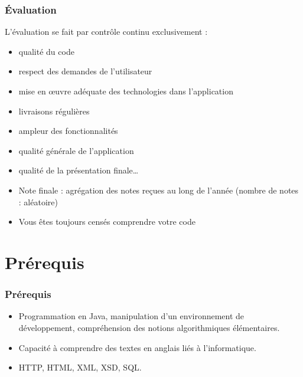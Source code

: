 \documentclass[english, french]{beamer}
\begin{document}
\begin{frame}
	\frametitle{Évaluation}
	L’évaluation se fait par contrôle continu exclusivement :
	\begin{itemize}
		\item qualité du code 
		\item respect des demandes de l’utilisateur
		\item mise en œuvre adéquate des technologies dans l’application
		\item livraisons régulières
		\item ampleur des fonctionnalités
		\item qualité générale de l’application
		\item qualité de la présentation finale…
		\item Note finale : agrégation des notes reçues au long de l’année (nombre de notes : aléatoire)
		\item Vous êtes toujours censés comprendre votre code
	\end{itemize}
\end{frame}

\section{Prérequis}
\begin{frame}
	\frametitle{Prérequis}
	\begin{itemize}
		\item Programmation en Java, manipulation d’un environnement de développement, compréhension des notions algorithmiques élémentaires.
		\item Capacité à comprendre des textes en anglais liés à l’informatique.
		\item HTTP, HTML, XML, XSD, SQL.
	\end{itemize}
\end{frame}
\end{document}
